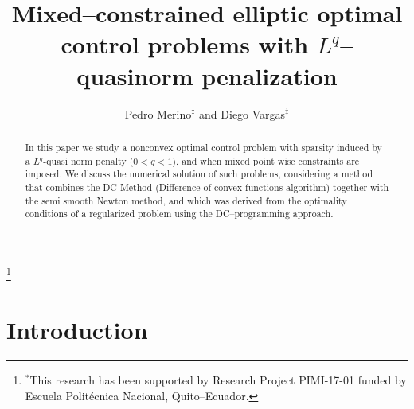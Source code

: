 \documentclass[11pt,a4paper]{amsart}
\begin{document}
	\title[Nonconvex optimal control problems]{ Mixed--constrained elliptic optimal control problems with $L^q$--quasinorm penalization}
	
	\author{Pedro Merino$^\ddag$ and Diego Vargas$^\ddag$}
	\address{$^\ddag$Research Center of Mathematical Modeling (MODEMAT) and Department of Mathematics, Escuela Polit\'ecnica Nacional, Quito, Ecuador}
	\keywords{}
	\thanks{$^*$This research has been supported by Research Project PIMI-17-01 funded by Escuela Polit\'ecnica Nacional, Quito--Ecuador.}
	
	\smallskip
\begin{abstract}
In this paper we study a nonconvex optimal control problem with sparsity induced by a $L^q$-quasi norm penalty ($0<q<1$), and when mixed point wise constraints are imposed. We discuss the numerical solution of such problems, considering a method that combines the DC-Method (Difference-of-convex functions algorithm) together with the semi smooth Newton method, and which was derived from the optimality conditions of a regularized problem using the DC--programming approach.
\end{abstract}
	
\maketitle 




\section{Introduction}
\end{document}
